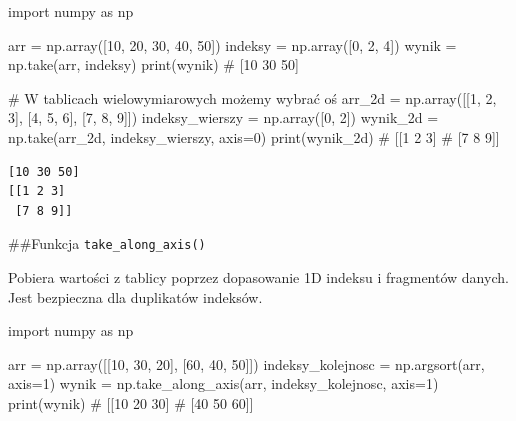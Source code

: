 \documentclass[
  polish,
  letterpaper,
  DIV=11,
  numbers=noendperiod]{scrreprt}
\newenvironment{Shaded}{\begin{snugshade}}{\end{snugshade}}
\newcommand{\BuiltInTok}[1]{\textcolor[rgb]{0.00,0.23,0.31}{#1}}
\newcommand{\CommentTok}[1]{\textcolor[rgb]{0.37,0.37,0.37}{#1}}
\newcommand{\DecValTok}[1]{\textcolor[rgb]{0.68,0.00,0.00}{#1}}
\newcommand{\ImportTok}[1]{\textcolor[rgb]{0.00,0.46,0.62}{#1}}
\newcommand{\NormalTok}[1]{\textcolor[rgb]{0.00,0.23,0.31}{#1}}
\newcommand{\OperatorTok}[1]{\textcolor[rgb]{0.37,0.37,0.37}{#1}}
\begin{document}
\begin{Shaded}
\begin{Highlighting}[]
\ImportTok{import}\NormalTok{ numpy }\ImportTok{as}\NormalTok{ np}

\NormalTok{arr }\OperatorTok{=}\NormalTok{ np.array([}\DecValTok{10}\NormalTok{, }\DecValTok{20}\NormalTok{, }\DecValTok{30}\NormalTok{, }\DecValTok{40}\NormalTok{, }\DecValTok{50}\NormalTok{])}
\NormalTok{indeksy }\OperatorTok{=}\NormalTok{ np.array([}\DecValTok{0}\NormalTok{, }\DecValTok{2}\NormalTok{, }\DecValTok{4}\NormalTok{])}
\NormalTok{wynik }\OperatorTok{=}\NormalTok{ np.take(arr, indeksy)}
\BuiltInTok{print}\NormalTok{(wynik)  }\CommentTok{\# [10 30 50]}

\CommentTok{\# W tablicach wielowymiarowych możemy wybrać oś}
\NormalTok{arr\_2d }\OperatorTok{=}\NormalTok{ np.array([[}\DecValTok{1}\NormalTok{, }\DecValTok{2}\NormalTok{, }\DecValTok{3}\NormalTok{], [}\DecValTok{4}\NormalTok{, }\DecValTok{5}\NormalTok{, }\DecValTok{6}\NormalTok{], [}\DecValTok{7}\NormalTok{, }\DecValTok{8}\NormalTok{, }\DecValTok{9}\NormalTok{]])}
\NormalTok{indeksy\_wierszy }\OperatorTok{=}\NormalTok{ np.array([}\DecValTok{0}\NormalTok{, }\DecValTok{2}\NormalTok{])}
\NormalTok{wynik\_2d }\OperatorTok{=}\NormalTok{ np.take(arr\_2d, indeksy\_wierszy, axis}\OperatorTok{=}\DecValTok{0}\NormalTok{)}
\BuiltInTok{print}\NormalTok{(wynik\_2d)}
\CommentTok{\# [[1 2 3]}
\CommentTok{\#  [7 8 9]]}
\end{Highlighting}
\end{Shaded}

\begin{verbatim}
[10 30 50]
[[1 2 3]
 [7 8 9]]
\end{verbatim}

\#\#Funkcja \texttt{take\_along\_axis()}

Pobiera wartości z tablicy poprzez dopasowanie 1D indeksu i fragmentów
danych. Jest bezpieczna dla duplikatów indeksów.

\begin{Shaded}
\begin{Highlighting}[]
\ImportTok{import}\NormalTok{ numpy }\ImportTok{as}\NormalTok{ np}

\NormalTok{arr }\OperatorTok{=}\NormalTok{ np.array([[}\DecValTok{10}\NormalTok{, }\DecValTok{30}\NormalTok{, }\DecValTok{20}\NormalTok{], [}\DecValTok{60}\NormalTok{, }\DecValTok{40}\NormalTok{, }\DecValTok{50}\NormalTok{]])}
\NormalTok{indeksy\_kolejnosc }\OperatorTok{=}\NormalTok{ np.argsort(arr, axis}\OperatorTok{=}\DecValTok{1}\NormalTok{)}
\NormalTok{wynik }\OperatorTok{=}\NormalTok{ np.take\_along\_axis(arr, indeksy\_kolejnosc, axis}\OperatorTok{=}\DecValTok{1}\NormalTok{)}
\BuiltInTok{print}\NormalTok{(wynik)}
\CommentTok{\# [[10 20 30]}
\CommentTok{\#  [40 50 60]]}
\end{Highlighting}
\end{Shaded}
\end{document}
